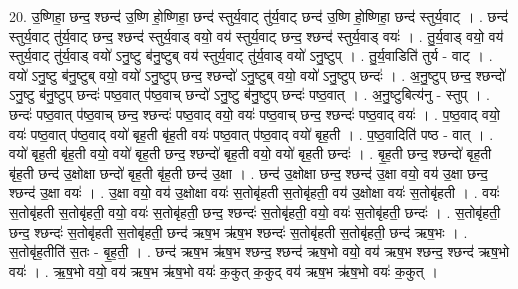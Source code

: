 \documentclass[17pt]{extarticle}
\begin{document}
20. उ॒ष्णिहा॒ छन्द॒ श्छन्द॑ उ॒ष्णि हो॒ष्णिहा॒ छन्द॑ स्तुर्य॒वाट् तु॑र्य॒वाट् छन्द॑ उ॒ष्णि हो॒ष्णिहा॒ छन्द॑ स्तुर्य॒वाट् । . छन्द॑ स्तुर्य॒वाट् तु॑र्य॒वाट् छन्द॒ श्छन्द॑ स्तुर्य॒वाड् वयो॒ वय॑ स्तुर्य॒वाट् छन्द॒ श्छन्द॑ स्तुर्य॒वाड् वयः॑ । . तु॒र्य॒वाड् वयो॒ वय॑ स्तुर्य॒वाट् तु॑र्य॒वाड् वयो॑ ऽनु॒ष्टु ब॑नु॒ष्टुब् वय॑ स्तुर्य॒वाट् तु॑र्य॒वाड् वयो॑ ऽनु॒ष्टुप् । . तु॒र्य॒वाडिति॑ तुर्य - वाट् । . वयो॑ ऽनु॒ष्टु ब॑नु॒ष्टुब् वयो॒ वयो॑ ऽनु॒ष्टुप् छन्द॒ श्छन्दो॑ ऽनु॒ष्टुब् वयो॒ वयो॑ ऽनु॒ष्टुप् छन्दः॑ । . अ॒नु॒ष्टुप् छन्द॒ श्छन्दो॑ ऽनु॒ष्टु ब॑नु॒ष्टुप् छन्दः॑ पष्ठ॒वात् प॑ष्ठ॒वाच् छन्दो॑ ऽनु॒ष्टु ब॑नु॒ष्टुप् छन्दः॑ पष्ठ॒वात् । . अ॒नु॒ष्टुबित्य॑नु - स्तुप् । . छन्दः॑ पष्ठ॒वात् प॑ष्ठ॒वाच् छन्द॒ श्छन्दः॑ पष्ठ॒वाद् वयो॒ वयः॑ पष्ठ॒वाच् छन्द॒ श्छन्दः॑ पष्ठ॒वाद् वयः॑ । . प॒ष्ठ॒वाद् वयो॒ वयः॑ पष्ठ॒वात् प॑ष्ठ॒वाद् वयो॑ बृह॒ती बृ॑ह॒ती वयः॑ पष्ठ॒वात् प॑ष्ठ॒वाद् वयो॑ बृह॒ती । . प॒ष्ठ॒वादिति॑ पष्ठ - वात् । . वयो॑ बृह॒ती बृ॑ह॒ती वयो॒ वयो॑ बृह॒ती छन्द॒ श्छन्दो॑ बृह॒ती वयो॒ वयो॑ बृह॒ती छन्दः॑ । . बृ॒ह॒ती छन्द॒ श्छन्दो॑ बृह॒ती बृ॑ह॒ती छन्द॑ उ॒क्षोक्षा छन्दो॑ बृह॒ती बृ॑ह॒ती छन्द॑ उ॒क्षा । . छन्द॑ उ॒क्षोक्षा छन्द॒ श्छन्द॑ उ॒क्षा वयो॒ वय॑ उ॒क्षा छन्द॒ श्छन्द॑ उ॒क्षा वयः॑ । . उ॒क्षा वयो॒ वय॑ उ॒क्षोक्षा वयः॑ स॒तोबृ॑हती स॒तोबृ॑हती॒ वय॑ उ॒क्षोक्षा वयः॑ स॒तोबृ॑हती । . वयः॑ स॒तोबृ॑हती स॒तोबृ॑हती॒ वयो॒ वयः॑ स॒तोबृ॑हती॒ छन्द॒ श्छन्दः॑ स॒तोबृ॑हती॒ वयो॒ वयः॑ स॒तोबृ॑हती॒ छन्दः॑ । . स॒तोबृ॑हती॒ छन्द॒ श्छन्दः॑ स॒तोबृ॑हती स॒तोबृ॑हती॒ छन्द॑ ऋष॒भ ऋ॑ष॒भ श्छन्दः॑ स॒तोबृ॑हती स॒तोबृ॑हती॒ छन्द॑ ऋष॒भः । . स॒तोबृ॑ह॒तीति॑ स॒तः - बृ॒ह॒ती॒ । . छन्द॑ ऋष॒भ ऋ॑ष॒भ श्छन्द॒ श्छन्द॑ ऋष॒भो वयो॒ वय॑ ऋष॒भ श्छन्द॒ श्छन्द॑ ऋष॒भो वयः॑ । . ऋ॒ष॒भो वयो॒ वय॑ ऋष॒भ ऋ॑ष॒भो वयः॑ क॒कुत् क॒कुद् वय॑ ऋष॒भ ऋ॑ष॒भो वयः॑ क॒कुत् । \newline
\end{document}
